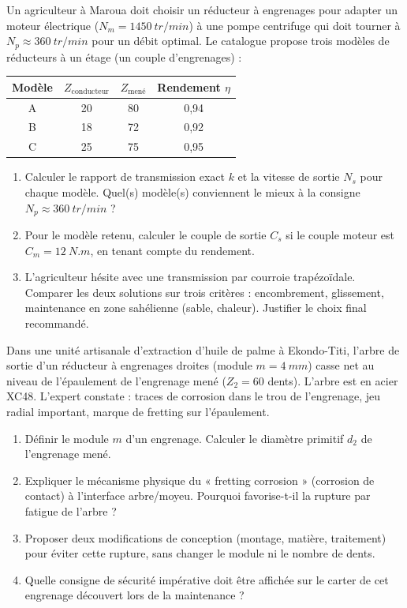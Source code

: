 \documentclass[11pt]{article}
\begin{document}
\begin{exercice}
Un agriculteur à Maroua doit choisir un réducteur à engrenages pour adapter un moteur électrique ($N_m = \SI{1450}{tr/min}$) à une pompe centrifuge qui doit tourner à $N_p \approx \SI{360}{tr/min}$ pour un débit optimal. Le catalogue propose trois modèles de réducteurs à un étage (un couple d'engrenages) :
\begin{center}
\begin{tabular}{|c|c|c|c|}
\hline
Modèle & $Z_{\text{conducteur}}$ & $Z_{\text{mené}}$ & Rendement $\eta$ \\
\hline
A & 20 & 80 & 0,94 \\
B & 18 & 72 & 0,92 \\
C & 25 & 75 & 0,95 \\
\hline
\end{tabular}
\end{center}
\begin{enumerate}
    \item Calculer le rapport de transmission exact $k$ et la vitesse de sortie $N_s$ pour chaque modèle. Quel(s) modèle(s) conviennent le mieux à la consigne $N_p \approx \SI{360}{tr/min}$ ?
    \item Pour le modèle retenu, calculer le couple de sortie $C_s$ si le couple moteur est $C_m = \SI{12}{N.m}$, en tenant compte du rendement.
    \item L'agriculteur hésite avec une transmission par courroie trapézoïdale. Comparer les deux solutions sur trois critères : encombrement, glissement, maintenance en zone sahélienne (sable, chaleur). Justifier le choix final recommandé.
\end{enumerate}
\end{exercice}

\begin{exercice}
Dans une unité artisanale d'extraction d'huile de palme à Ekondo-Titi, l'arbre de sortie d'un réducteur à engrenages droites (module $m = \SI{4}{mm}$) casse net au niveau de l'épaulement de l'engrenage mené ($Z_2 = 60$ dents). L'arbre est en acier XC48. L'expert constate : traces de corrosion dans le trou de l'engrenage, jeu radial important, marque de fretting sur l'épaulement.
\begin{enumerate}
    \item Définir le module $m$ d'un engrenage. Calculer le diamètre primitif $d_2$ de l'engrenage mené.
    \item Expliquer le mécanisme physique du « fretting corrosion » (corrosion de contact) à l'interface arbre/moyeu. Pourquoi favorise-t-il la rupture par fatigue de l'arbre ?
    \item Proposer deux modifications de conception (montage, matière, traitement) pour éviter cette rupture, sans changer le module ni le nombre de dents.
    \item Quelle consigne de sécurité impérative doit être affichée sur le carter de cet engrenage découvert lors de la maintenance ?
\end{enumerate}
\end{exercice}
\end{document}
